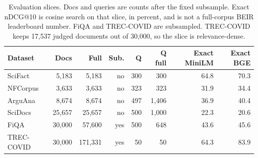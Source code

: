 \begin{table}[t]
\centering
\caption{Evaluation slices. Docs and queries are counts after the fixed subsample. Exact nDCG@10 is cosine search on that slice, in percent, and is not a full-corpus BEIR leaderboard number. FiQA and TREC-COVID are subsampled. TREC-COVID keeps 17{,}537 judged documents out of 30{,}000, so the slice is relevance-dense.}
\label{tab:data}
\small
\setlength{\tabcolsep}{3.5pt}
\begin{tabular}{lrrrrrrr}
\toprule
Dataset & Docs & Full & Sub. & Q & Q full & Exact MiniLM & Exact BGE \\
\midrule
SciFact & 5,183 & 5,183 & no & 300 & 300 & 64.8 & 70.3 \\
NFCorpus & 3,633 & 3,633 & no & 323 & 323 & 31.9 & 34.4 \\
ArguAna & 8,674 & 8,674 & no & 497 & 1,406 & 36.9 & 40.4 \\
SciDocs & 25,657 & 25,657 & no & 500 & 1,000 & 22.3 & 20.6 \\
FiQA & 30,000 & 57,600 & yes & 500 & 648 & 43.6 & 45.6 \\
TREC-COVID & 30,000 & 171,331 & yes & 50 & 50 & 64.3 & 83.9 \\
\bottomrule
\end{tabular}
\end{table}
